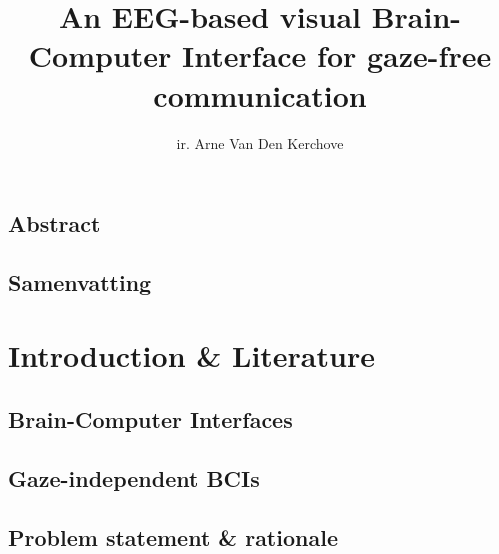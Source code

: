 %
\usepackage{todonotes}
\usepackage{hyperref}
\usepackage{tabularx}
\usepackage{booktabs}
\usepackage[inline]{enumitem}
\usepackage{subcaption}
\usepackage{algorithm}
\usepackage{algpseudocode}


\newcommand{\includechapter}[2]{
  \chapter{#1}
  \begin{refsection}
  
    \printbibliography[heading=subbibliography]
  \end{refsection}
  \clearpage
}

\usepackage[backend=biber]{biblatex}



\title{\sffamily An EEG-based visual Brain-Computer Interface for gaze-free communication}
\author{ir. Arne Van Den Kerchove}




\pagestyle{front}
\frontmatter


\chapter{Abstract}
\chapter{Samenvatting}
\tableofcontents
\listoffigures
\listoftables



\mainmatter%
\pagestyle{main}


\part{Introduction \& Literature}
\includechapter{Brain-Computer Interfaces}{chapters/bci.tex}
\includechapter{Gaze-independent BCIs}{chapters/gaze_independence.tex}
\includechapter{Problem statement \& rationale}{chapters/problem_statement.tex}

